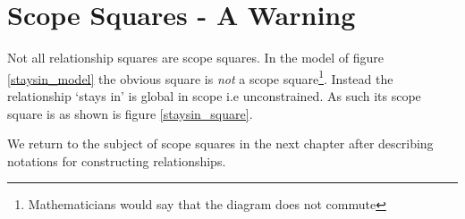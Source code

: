 
\section{Scope Squares - A Warning}
\noindent Not all relationship squares are scope squares. In the model of figure \ref{staysin_model} the obvious square is \emph{not} a scope square\footnote{Mathematicians would say that the diagram does not commute}. 
Instead the relationship `stays in' is global in scope i.e unconstrained. As such its scope square is as shown is figure \ref{staysin_square}.




\noindent We return to the subject of scope squares in the next chapter after describing notations for constructing relationships. 





